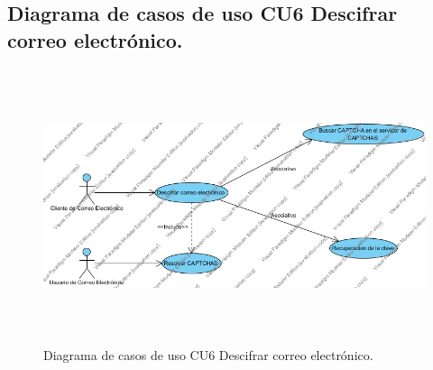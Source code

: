 \subsection{Diagrama de casos de uso CU6 Descifrar correo electrónico.}
\begin{figure}[H]
	\includegraphics[width=1\linewidth, height=8cm]{./images/casodeuso6.jpg}
	\caption{Diagrama de casos de uso CU6 Descifrar correo electrónico.}
	\label{fig:4-7-1}
\end{figure}
